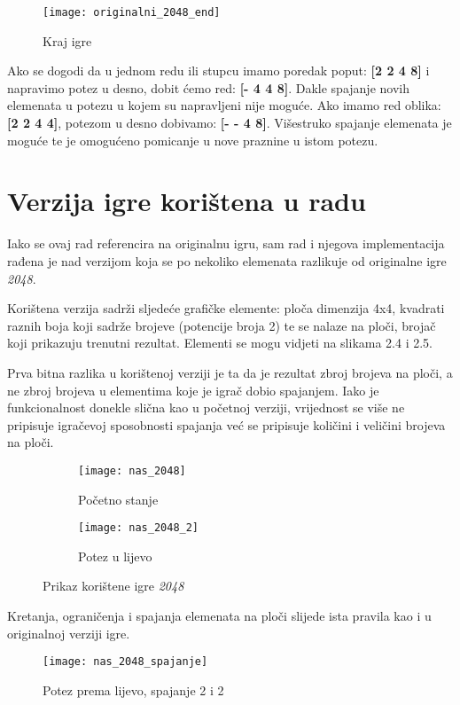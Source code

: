 \begin{figure}[h]
	\centering
	\texttt{[image: originalni\_2048\_end]}
	\caption{Kraj igre \cite{2048official}}
\end{figure}
\par
 Ako se dogodi da u jednom redu ili stupcu imamo poredak poput:
 \textbf{[2 2 4 8]} i napravimo potez u desno, dobit ćemo red: \textbf{[- 4 4 8]}. Dakle spajanje novih elemenata u potezu u kojem su napravljeni nije moguće. Ako imamo red oblika: \textbf{[2 2 4 4]}, potezom u desno dobivamo: \textbf{[- - 4 8]}. Višestruko spajanje elemenata je moguće te je omogućeno pomicanje u nove praznine u istom potezu.


\section{Verzija igre korištena u radu}
\quad Iako se ovaj rad referencira na originalnu igru, sam rad i njegova implementacija rađena je nad verzijom koja se po nekoliko elemenata razlikuje od originalne igre \textit{2048}.\par
Korištena verzija sadrži sljedeće grafičke elemente: ploča dimenzija 4x4, kvadrati raznih boja koji sadrže brojeve (potencije broja 2) te se nalaze na ploči, brojač koji prikazuju trenutni rezultat. Elementi se mogu vidjeti na slikama 2.4 i 2.5.
\par 
Prva bitna razlika u korištenoj verziji je ta da je rezultat zbroj brojeva na ploči, a ne zbroj brojeva u elementima koje je igrač dobio spajanjem. Iako je funkcionalnost donekle slična kao u početnoj verziji, vrijednost se više ne pripisuje igračevoj sposobnosti spajanja već se pripisuje količini i veličini brojeva na ploči.\newpage
\begin{figure}[h]
	\begin{subfigure}{0.5\textwidth}
		\texttt{[image: nas\_2048]} 
		\caption{Početno stanje}
	\end{subfigure}
	\begin{subfigure}{0.5\textwidth}
		\texttt{[image: nas\_2048\_2]}
		\caption{Potez u lijevo}
	\end{subfigure}
	
	\caption{Prikaz korištene igre \textit{2048}}
\end{figure} 
Kretanja, ograničenja i spajanja elemenata na ploči slijede ista pravila kao i u originalnoj verziji igre.\newline
\begin{figure}[h]
	\centering
	\texttt{[image: nas\_2048\_spajanje]}
	\caption{Potez prema lijevo, spajanje 2 i 2}
\end{figure}
